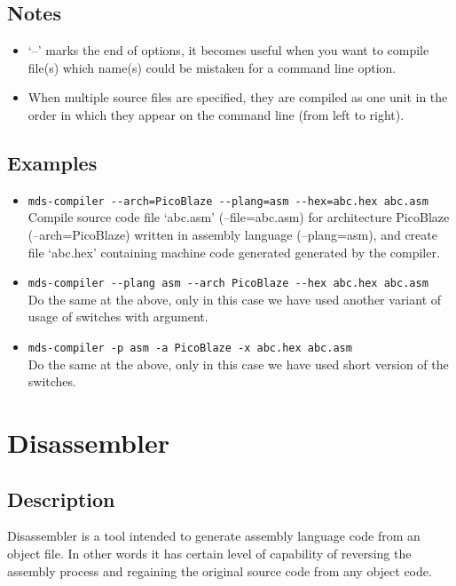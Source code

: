     \subsection{Notes}
        \begin{itemize}
            \item `--' marks the end of options, it becomes useful when you want to compile file(s) which name(s) could be mistaken for a command line option.
            \item When multiple source files are specified, they are compiled as one unit in the order in which they appear on the command line (from left to right).
        \end{itemize}

    \subsection{Examples}
        \begin{itemize}
            \item \verb'mds-compiler --arch=PicoBlaze --plang=asm --hex=abc.hex abc.asm'\\
                Compile source code file `abc.asm' (--file=abc.asm) for architecture PicoBlaze (--arch=PicoBlaze) written in assembly language (--plang=asm), and create file `abc.hex' containing machine code generated generated by the compiler.

            \item \verb'mds-compiler --plang asm --arch PicoBlaze --hex abc.hex abc.asm'\\
                Do the same at the above, only in this case we have used another variant of usage of switches with argument.

            \item \verb'mds-compiler -p asm -a PicoBlaze -x abc.hex abc.asm'\\
                Do the same at the above, only in this case we have used short version of the switches.
        \end{itemize}

\section{Disassembler}
    \subsection{Description}
        Disassembler is a tool intended to generate assembly language code from an object file. In other words it has certain level of capability of reversing the assembly process and regaining the original source code from any object code.

